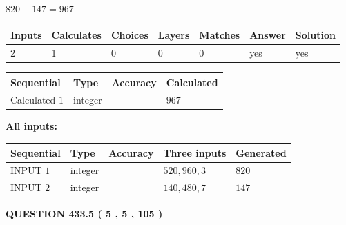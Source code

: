 \documentclass{ctexart}
\begin{document}
 

$ %
820 +  %
147=   %
967$
 
 
\noindent{}
 
 

 
   
   
   
   
\noindent\begin{tabular}{|l|l|l|l|l|l|l|}
 \hline
Inputs & Calculates & Choices & Layers & Matches & Answer & Solution \\ \hline
 2  & 
 1  & 
 0
  & 
 0  & 
 0  & 
  yes & 
  yes 
  \\ \hline
 \end{tabular}
   
   
   
   
\noindent{}
   
   
  
  
\noindent\begin{tabular}{|l|l|l|l|}
\hline
 Sequential & Type & Accuracy & Calculated \\ 
\hline
 
 
  Calculated $  1 $ & integer &  & 
  $ 967 $ 
 \\  \hline  
 \end{tabular}
   
   
   
   
\noindent\vspace{0.1in}\hspace{-0.08in} {\textbf{\Large{All inputs: }}}
   
   
  
  
\noindent\begin{tabular}{|l|l|l|l|l|}
\hline
 Sequential & Type & Accuracy & Three inputs & Generated \\ 
\hline
 
 
  INPUT $  1 $ & integer &  & $
 520
 , 
 960
 , 
 3
 $ & $ 820 $ 
 \\  \hline  
 
 
  INPUT $  2 $ & integer &  & $
 140
 , 
 480
 , 
 7
 $ & $ 147 $ 
 \\  \hline  
 \end{tabular}
   
   
  
\vspace{0.2in}
  
{\textbf{\Large{QUESTION
433.5 
 ( 5 , 5 , 105 )
}}}
  
\end{document}
